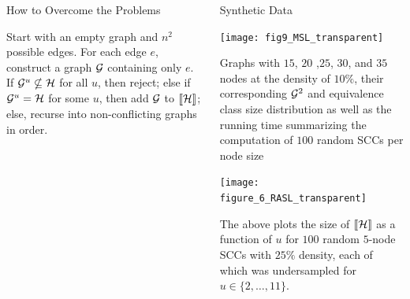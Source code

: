 \documentclass[final,hyperref={pdfpagelabels=false}]{beamer}
\renewcommand{\raggedright}{\leftskip=0.5cm \rightskip=0.5cm plus 0cm}
\begin{document}
\begin{frame}{}
\begin{columns}[t]
\begin{column}{.48\linewidth}
\begin{block}{\Large How to Overcome the Problems}
        \begin{minipage}{.9\textwidth}
        \vspace{20 mm}
          Start with an empty graph and $n^2$  possible edges. For each edge $e$, construct a graph ${\cal G}$ containing only $e$. If ${\cal G}^{u} \nsubseteq {\cal  H}$  for all $u$, then reject; else if ${\cal G}^{u} = {\cal  H}$ for some $u$, then add ${\cal G}$ to $\llbracket{\cal H}\rrbracket$; else, recurse into non-conflicting graphs in order.
        \end{minipage}%
        \end{block}
  
  

      \end{column}
      \begin{column}{.48\linewidth}


        \begin{block}{\Large Synthetic Data}
          \begin{minipage}{1\textwidth}
          \texttt{[image: fig9\_MSL\_transparent]}
        \end{minipage} %

        \begin{minipage}{.95\textwidth}
        \vspace{5 mm}
           Graphs with $15$, $20$ ,$25$, $30$, and $35$ nodes at the density of $10\%$, their corresponding ${\cal G}^{2}$ and equivalence class size distribution as well as the running time summarizing the computation of $100$ random SCCs per node size
        \end{minipage}%

        \begin{minipage}{1\textwidth}
                \vspace{5 mm}
          \texttt{[image: figure\_6\_RASL\_transparent]}
        \end{minipage} %

        \begin{minipage}{.95\textwidth}
        \vspace{5 mm}
           The above plots the size of $\llbracket{\cal H}\rrbracket$ as a function of $u$ for $100$ random $5$-node SCCs with $25\%$ density,  each  of  which   was undersampled  for $u \in \{ 2 , \ldots , 11 \}$. 
        \end{minipage}%
       

\end{block}
\end{column}
\end{columns}
\end{frame}
\end{document}
